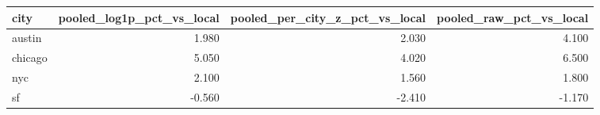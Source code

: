 \begin{tabular}{lrrr}
\toprule
city & pooled\_log1p\_pct\_vs\_local & pooled\_per\_city\_z\_pct\_vs\_local & pooled\_raw\_pct\_vs\_local \\
\midrule
austin & 1.980 & 2.030 & 4.100 \\
chicago & 5.050 & 4.020 & 6.500 \\
nyc & 2.100 & 1.560 & 1.800 \\
sf & -0.560 & -2.410 & -1.170 \\
\bottomrule
\end{tabular}
